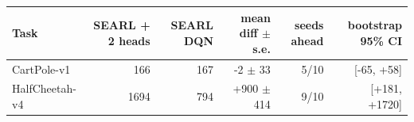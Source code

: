 \begin{tabular}{lrrrrr}
\toprule
Task & SEARL + 2 heads & SEARL DQN & mean diff $\pm$ s.e. & seeds ahead & bootstrap 95\% CI \\
\midrule
CartPole-v1 & 166 & 167 & -2 $\pm$ 33 & 5/10 & [-65, +58] \\
HalfCheetah-v4 & 1694 & 794 & +900 $\pm$ 414 & 9/10 & [+181, +1720] \\
\bottomrule
\end{tabular}
